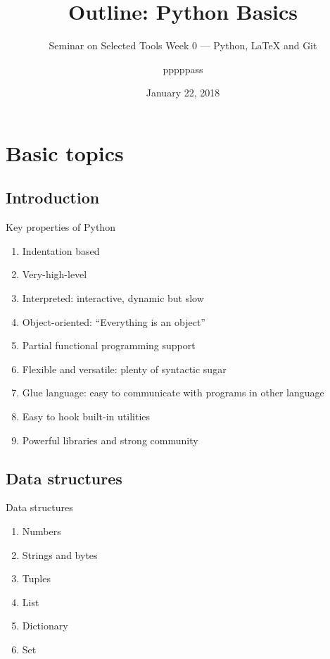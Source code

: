 \documentclass[english, nochinese]{../TeXTemplate/pkuslide}
\title{Outline: Python Basics}
\subtitle{Seminar on Selected Tools Week 0 --- Python, \texorpdfstring{\LaTeX}{LaTeX} and Git}
\author{pppppass}
\date{January 22, 2018}
\begin{document}
\begin{frame}
\titlepage
\end{frame}

\begin{frame}
\tableofcontents[subsectionstyle=show]
\end{frame}

\section{Basic topics}

\begin{frame}
\sectionpage
\end{frame}

\subsection{Introduction}

\begin{frame}{Key properties of Python}
\begin{enumerate}
\item Indentation based
\item Very-high-level
\item Interpreted: interactive, dynamic but slow
\item Object-oriented: ``Everything is an object''
\item Partial functional programming support
\item Flexible and versatile: plenty of syntactic sugar
\item Glue language: easy to communicate with programs in other language
\item Easy to hook built-in utilities
\item Powerful libraries and strong community
\end{enumerate}
\end{frame}

\subsection{Data structures}

\begin{frame}{Data structures}
\begin{enumerate}
\item Numbers
\item Strings and bytes
\item Tuples
\item List
\item Dictionary
\item Set
\end{enumerate}
\end{frame}
\end{document}

